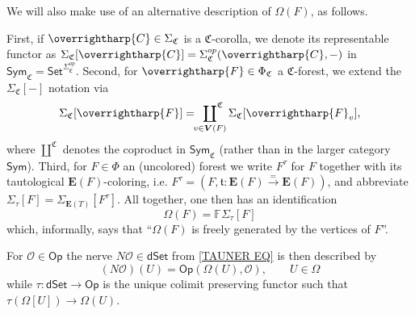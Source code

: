 \documentclass[a4paper,10pt
,draft
]{article}%
\numberwithin{equation}{section}
\numberwithin{figure}{section}
\theoremstyle{definition} %
\newcommand{\vect}[1]{\text{\overrightharp{\ensuremath{#1}}}}
\newcommand{\Sym}{\ensuremath{\mathsf{Sym}}}%
\renewcommand{\O}{\ensuremath{\mathcal O}}
\newcommand{\1}{\ensuremath{\mathbbm 1}}%
\begin{document}
We will also make use of an alternative description of $\Omega(F)$, as follows.

First, if $\vect{C}\in \Sigma_{\mathfrak{C}}$ is a
$\mathfrak{C}$-corolla,
we denote its representable functor as 
$\Sigma_{\mathfrak C}[\vect C] =
\Sigma_{\mathfrak C}^{op}(\vect C, -)$ in 
$\Sym_{\mathfrak C} = \mathsf{Set}^{\Sigma^{op}_{\mathfrak{C}}}$.
Second, for
$\vect{F}\in \Phi_{\mathfrak{C}}$ a
$\mathfrak{C}$-forest, 
we extend the 
$\Sigma_{\mathfrak C}[-]$ notation via
\[
	\Sigma_{\mathfrak C}[\vect F] = \sideset{}{^{\mathfrak C}}\coprod_{v \in \boldsymbol{V}(F)} \Sigma_{\mathfrak C}[\vect F_v],
\]
where $\amalg^{\mathfrak C}$ denotes the coproduct
in $\Sym_{\mathfrak C}$ (rather than in the larger category $\Sym$).
Third, for 
$F \in \Phi$
an (uncolored) forest we write
$F^{\tau}$ for $F$ together with its tautological 
$\boldsymbol{E}(F)$-coloring, i.e.
$F^{\tau} = 
(F,\mathfrak{t}\colon \boldsymbol{E}(F) \xrightarrow{=} \boldsymbol{E}(F))$,
and abbreviate
$\Sigma_{\tau}[F] = \Sigma_{\boldsymbol{E}(T)}[F^{\tau}]$.
All together, one then has an identification
\begin{equation}\label{OMFFREE EQ}
	\Omega(F) = \mathbb{F} \Sigma_{\tau}[F]
\end{equation}
which, informally, says that 
``$\Omega(F)$ is freely generated by the vertices of $F$''.

For $\O \in \mathsf{Op}$
the nerve $N \O \in \mathsf{dSet}$ from \eqref{TAUNER EQ}
is then described by
\[
	(N \O) (U) = \mathsf{Op}(\Omega(U),\O),\qquad U \in \Omega
\]
while $\tau\colon \mathsf{dSet} \to \mathsf{Op}$
is the unique colimit preserving functor such that
$\tau(\Omega[U]) \to \Omega(U)$.
\end{document}
